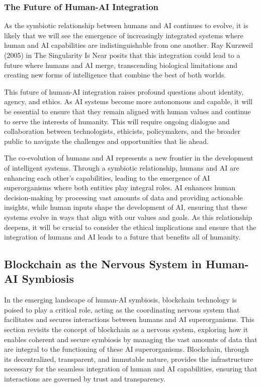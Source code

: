 \documentclass[12pt,twoside]{article}
\begin{document}
\subsubsection{The Future of Human-AI Integration}

As the symbiotic relationship between humans and AI continues to evolve, it is likely that we will see the emergence of increasingly integrated systems where human and AI capabilities are indistinguishable from one another. Ray Kurzweil (2005) in The Singularity Is Near posits that this integration could lead to a future where humans and AI merge, transcending biological limitations and creating new forms of intelligence that combine the best of both worlds.

This future of human-AI integration raises profound questions about identity, agency, and ethics. As AI systems become more autonomous and capable, it will be essential to ensure that they remain aligned with human values and continue to serve the interests of humanity. This will require ongoing dialogue and collaboration between technologists, ethicists, policymakers, and the broader public to navigate the challenges and opportunities that lie ahead.

The co-evolution of humans and AI represents a new frontier in the development of intelligent systems. Through a symbiotic relationship, humans and AI are enhancing each other’s capabilities, leading to the emergence of AI superorganisms where both entities play integral roles. AI enhances human decision-making by processing vast amounts of data and providing actionable insights, while human inputs shape the development of AI, ensuring that these systems evolve in ways that align with our values and goals. As this relationship deepens, it will be crucial to consider the ethical implications and ensure that the integration of humans and AI leads to a future that benefits all of humanity.

\subsection{Blockchain as the Nervous System in Human-AI Symbiosis}

In the emerging landscape of human-AI symbiosis, blockchain technology is poised to play a critical role, acting as the coordinating nervous system that facilitates and secures interactions between humans and AI superorganisms. This section revisits the concept of blockchain as a nervous system, exploring how it enables coherent and secure symbiosis by managing the vast amounts of data that are integral to the functioning of these AI superorganisms. Blockchain, through its decentralized, transparent, and immutable nature, provides the infrastructure necessary for the seamless integration of human and AI capabilities, ensuring that interactions are governed by trust and transparency.
\end{document}

